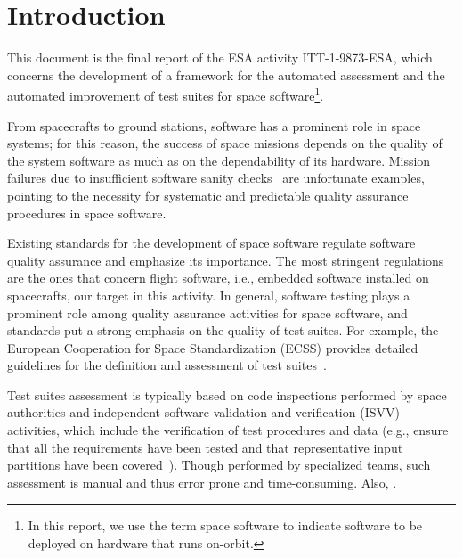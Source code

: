 
\chapter*{Introduction}
\label{sec:introduction}

This document is the final report of the ESA activity ITT-1-9873-ESA, which concerns the development of a framework for the automated assessment and the automated improvement of test suites for space software\footnote{In this report, we use the term space software to indicate software to be deployed on hardware that runs on-orbit.}.

From spacecrafts to ground stations, software has a prominent role in space systems; for this reason, the success of space missions depends on the quality of the system software as much as on the dependability of its hardware. Mission failures due to insufficient software sanity checks~\cite{Schiaparelli} are unfortunate examples, pointing to the necessity for systematic and predictable quality assurance procedures in space software.


Existing standards for the development of space software regulate software quality assurance and emphasize its importance.
The most stringent regulations are the ones that concern flight software, i.e., embedded software installed on spacecrafts, our target in this activity.
In general, software testing plays a prominent role among  quality assurance activities for space software, and standards put a strong emphasis on the quality of test suites. For example, the European Cooperation for Space Standardization (ECSS) provides detailed guidelines for the definition and assessment of test suites~\cite{ecss80C,ecss40C}.

Test suites assessment
is typically based on code inspections performed by space authorities and
independent software validation and verification (ISVV) activities, which include the verification of test procedures and data (e.g., ensure that all the requirements have been tested and that representative input partitions have been covered~\cite{ISVV}). Though performed by specialized teams, such assessment is manual and thus error prone and time-consuming. 
 Also, .

